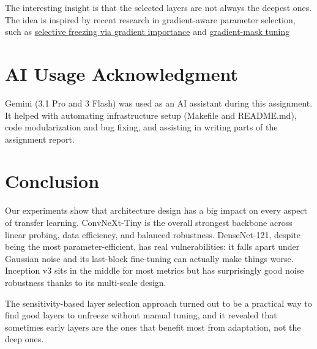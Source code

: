 \documentclass[11pt,a4paper]{article}
\begin{document}
The interesting insight is that the selected layers are not always the deepest ones. \\
The idea is inspired by recent research in gradient-aware parameter selection, such as \href{https://ieeexplore.ieee.org/document/10510130}{selective freezing via gradient importance} and \href{https://arxiv.org/abs/2406.15330}{gradient-mask tuning}

\section{AI Usage Acknowledgment}

Gemini (3.1 Pro and 3 Flash) was used as an AI assistant during this assignment. It helped with automating infrastructure setup (Makefile and README.md), code modularization and bug fixing, and assisting in writing parts of the assignment report.

\section{Conclusion}

Our experiments show that architecture design has a big impact on every aspect of transfer learning.
ConvNeXt-Tiny is the overall strongest backbone across linear probing, data efficiency, and balanced robustness.
DenseNet-121, despite being the most parameter-efficient, has real vulnerabilities: it falls apart under Gaussian noise and its last-block fine-tuning can actually make things worse.
Inception v3 sits in the middle for most metrics but has surprisingly good noise robustness thanks to its multi-scale design.

The sensitivity-based layer selection approach turned out to be a practical way to find good layers to unfreeze without manual tuning, and it revealed that sometimes early layers are the ones that benefit most from adaptation, not the deep ones.
\end{document}
